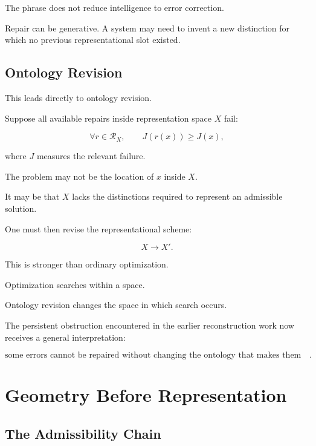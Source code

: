\documentclass[11pt]{article}
\theoremstyle{remark}
\begin{document}
The phrase does not reduce intelligence to error correction.

Repair can be generative. A system may need to invent a new distinction for which no previous representational slot existed.

\subsection{Ontology Revision}

This leads directly to ontology revision.

Suppose all available repairs inside representation space $X$ fail:

\begin{equation}
\forall r\in\mathcal{R}_X,
\qquad
J(r(x))\geq J(x),
\end{equation}

where $J$ measures the relevant failure.

The problem may not be the location of $x$ inside $X$.

It may be that $X$ lacks the distinctions required to represent an admissible solution.

One must then revise the representational scheme:

\begin{equation}
X
\longrightarrow
X'.
\end{equation}

This is stronger than ordinary optimization.

Optimization searches within a space.

Ontology revision changes the space in which search occurs.

The persistent obstruction encountered in the earlier reconstruction work now receives a general interpretation:

\begin{equation}
\boxed{
\text{some errors cannot be repaired without changing the ontology that makes them errors}.
}
\end{equation}

\section{Geometry Before Representation}

\subsection{The Admissibility Chain}
\end{document}
